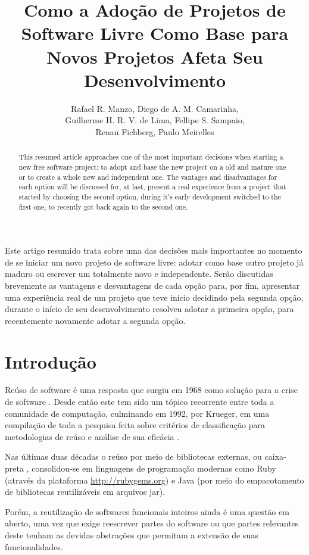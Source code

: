\documentclass[12pt]{article}
\title{Como a Adoção de Projetos de Software Livre Como Base para Novos Projetos Afeta Seu Desenvolvimento}
\author{Rafael R. Manzo\inst{1}, Diego de A. M. Camarinha\inst{1},\\
        Guilherme H. R. V. de Lima\inst{1}, Fellipe S. Sampaio\inst{1},\\
        Renan Fichberg\inst{1}, Paulo Meirelles\inst{2}}
\begin{document}
\maketitle

\begin{abstract}
  This resumed article approaches one of the most important decisions when starting a new free software project: to adopt and base the new project on a old and mature one or to create a whole new and independent one. The vantages and disadvantages for each option will be discussed for, at last, present a real experience from a project that started by choosing the second option, during it's early development switched to the first one, to recently got back again to the second one.
\end{abstract}

\begin{resumo}
  Este artigo resumido trata sobre uma das decisões mais importantes no momento de se iniciar um novo projeto de software livre: adotar como base outro projeto já maduro ou escrever um totalmente novo e independente. Serão discutidas brevemente as vantagens e desvantagens de cada opção para, por fim, apresentar uma experiência real de um projeto que teve início decidindo pela segunda opção, durante o início de seu desenvolvimento resolveu adotar a primeira opção, para recentemente novamente adotar a segunda opção.
\end{resumo}


\section{Introdução} \label{sec:introducao}
Reúso de software é uma resposta que surgiu em 1968 como solução para a crise de software \cite{nr68}. Desde então este tem sido um tópico recorrente entre toda a comunidade de computação, culminando em 1992, por Krueger, em uma compilação de toda a pesquisa feita sobre critérios de classificação para metodologias de reúso e análise de sua eficácia \cite{k92}.

Nas últimas duas décadas o reúso por meio de bibliotecas externas, ou caixa-preta \cite{hdghi11}, consolidou-se em linguagens de programação modernas como Ruby (através da plataforma \url{http://rubygems.org}) e Java (por meio do empacotamento de bibliotecas reutilizáveis em arquivos jar).

Porém, a reutilização de softwares funcionais inteiros ainda é uma questão em aberto, uma vez que exige reescrever partes do software ou que partes relevantes deste tenham as devidas abstrações que permitam a extensão de suas funcionalidades.
\end{document}
